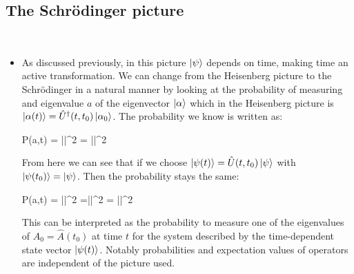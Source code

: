 \documentclass[11pt]{article}
\numberwithin{equation}{section}
\newenvironment{bux}{\empheq[box=\tcbhighmath]{align}}{\endempheq}
\begin{document}
\subsection{The Schr\"odinger picture} \
\begin{itemize}
    \item As discussed previously, in this picture $\ket{\psi}$ depends on time, making time an active transformation. We can change from the Heisenberg picture to the Schr\"odinger in a natural manner by looking at the probability of measuring and eigenvalue $a$ of the eigenvector $\ket{\alpha}$ which in the Heisenberg picture is $\ket{\alpha(t)} = \hat{U}^{\dagger}(t,t_0)\ket{\alpha_0}$. The probability we know is written as:
\begin{bux}
    \begin{split}
        P(a,t) = ||^2 = ||^2
    \end{split}
\end{bux}
From here we can see that if we choose $\ket{\psi(t)} =  \hat{U}(t,t_0)\ket{\psi}$ with $\ket{\psi(t_0)} = \ket{\psi}$. Then the probability stays the same:
\begin{bux}
    \begin{split}
        P(a,t) = ||^2 =||^2 = ||^2
    \end{split}
\end{bux}
This can be interpreted as the probability to measure one of the eigenvalues of $\hat{A}_0 = \hat{A}(t_0)$ at time $t$ for the system described by the time-dependent state vector $\ket{\psi(t)}$.  Notably probabilities and expectation values of operators are independent of the picture used. 


\end{itemize}
\end{document}
